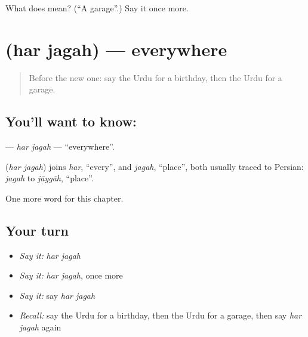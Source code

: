 \begin{tcolorbox}[breakable,colback=teal!4,colframe=teal!35!black,title={Before you move on}]
What does  mean? (\textquotedblleft{}A garage\textquotedblright{}.) Say it once more.
\end{tcolorbox}
\section[\texorpdfstring{\ur{ہر} \ur{جگہ} (har jagah)}{ہر جگہ (har jagah)}]{  (har jagah) — everywhere}

\label{lesson:UR-C246-har-jagah}



\begin{quote}
Before the new one: say the Urdu for a birthday, then the Urdu for a garage.
\end{quote}

\subsection*{You'll want to know:  }
\textbf{ } — \emph{har jagah} — \textquotedblleft{}everywhere\textquotedblright{}.

\begin{cousinweb}
\textbf{ } (\emph{har jagah}) joins \emph{har}, \textquotedblleft{}every\textquotedblright{}, and \emph{jagah}, \textquotedblleft{}place\textquotedblright{}, both usually traced to Persian: \emph{jagah} to \emph{jāygāh}, \textquotedblleft{}place\textquotedblright{}.
\end{cousinweb}

\begin{grammarlens}[title={What you've built}]
One more word for this chapter.
\end{grammarlens}

\subsection*{Your turn}
\begin{itemize}
\raggedright
  \item \emph{Say it:} \emph{har jagah}
  \item \emph{Say it:} \emph{har jagah}, once more
  \item \emph{Say it:} say \emph{har jagah}
  \item \emph{Recall:} say the Urdu for a birthday, then the Urdu for a garage, then say \emph{har jagah} again
\end{itemize}

